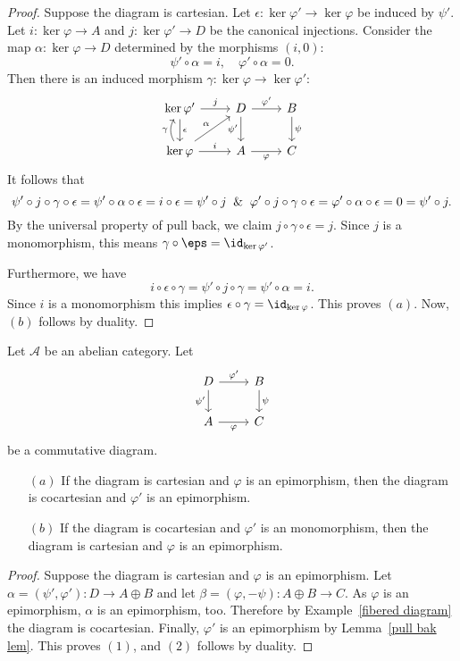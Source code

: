 \begin{proof}
Suppose the diagram is cartesian. Let $\epsilon:\ker\varphi'\to\ker\varphi$ be induced by $\psi'$. Let $i:\ker\varphi\to A$ and $j:\ker\varphi'\to D$ be the canonical injections. Consider the map $\alpha:\ker\varphi\to D$ determined by the morphisms $(i,0)$:
\[\psi'\circ\alpha=i,\quad \varphi'\circ\alpha=0.\]
Then there is an induced morphism $\gamma:\ker\varphi\to\ker\varphi'$:
\[\begin{tikzcd}
\ker\varphi'\ar[r,"j"]\ar[d,"\epsilon"]&D\ar[d,swap,"\psi'"]\ar[r,"\varphi'"]&B\ar[d,"\psi"]\\
\ker\varphi\ar[r,"i"]\ar[ru,"\alpha"]\ar[u,bend left=30pt,"\gamma"]&A\ar[r,swap,"\varphi"]&C
\end{tikzcd}\]
It follows that
\[\psi'\circ j\circ\gamma\circ\epsilon=\psi'\circ\alpha\circ\epsilon=i\circ\epsilon=\psi'\circ j\And\varphi'\circ j\circ\gamma\circ\epsilon=\varphi'\circ\alpha\circ\epsilon=0=\psi'\circ j.\]
By the universal property of pull back, we claim $j\circ\gamma\circ\epsilon=j$. Since $j$ is a monomorphism, this means $\gamma\circ\eps=\id_{\ker\varphi'}$.\par
Furthermore, we have 
\[i\circ\epsilon\circ\gamma=\psi'\circ j\circ\gamma=\psi'\circ\alpha=i.\]
Since $i$ is a monomorphism this implies $\epsilon\circ\gamma=\id_{\ker\varphi}$. This proves $(a)$. Now, $(b)$ follows by duality.
\end{proof}
\begin{lemma}
Let $\mathcal{A}$ be an abelian category. Let
\[\begin{tikzcd}
D\ar[d,swap,"\psi'"]\ar[r,"\varphi'"]&B\ar[d,"\psi"]\\
A\ar[r,swap,"\varphi"]&C
\end{tikzcd}\]
be a commutative diagram.
\begin{itemize}
\item[$(a)$] If the diagram is cartesian and $\varphi$ is an epimorphism, then the diagram is cocartesian and $\varphi'$ is an epimorphism.
\item[$(b)$] If the diagram is cocartesian and $\varphi'$ is an monomorphism, then the diagram is cartesian and $\varphi$ is an epimorphism.
\end{itemize}
\end{lemma}
\begin{proof}
Suppose the diagram is cartesian and $\varphi$ is an epimorphism. Let $\alpha=(\psi',\varphi'):D\to A\oplus B$ and let $\beta=(\varphi,-\psi):A\oplus B\to C$. As $\varphi$ is an epimorphism, $\alpha$ is an epimorphism, too. Therefore by Example~\ref{fibered diagram} the diagram is cocartesian. Finally, $\varphi'$ is an epimorphism by Lemma~\ref{pull bak lem}. This proves $(1)$, and $(2)$ follows by duality.
\end{proof}
